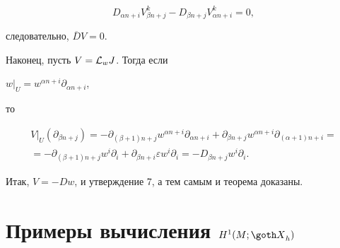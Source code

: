 $$


D_{\alpha n + i}V_{\beta n + j}^k -D_{\beta n + j}V_{\alpha n + i}^k = 0,


$$


следовательно, $\overline D V = 0$.





Наконец, пусть $V = {\cal L}_wJ$. Тогда если


$\left. w \right|_U =


w^{\alpha n + i}\partial_{\alpha n + i}$,


то


\begin{gather*}


\left. V \right|_U(\partial_{\beta n + j}) =


-


\partial_{(\beta+1)n + j}w^{\alpha n + i}\partial_{\alpha n + i}


+ \partial_{\beta n + j}w^{\alpha n + i}\partial_{(\alpha + 1)n + i}


=\\


%


= - \partial_{(\beta+1)n + j} w^i \partial_i  +


\partial_{\beta n + i} \varepsilon w^i \partial_i =


- D_{\beta n + j}w^i \partial_i.


\end{gather*}


Итак, $V = - D w$, и утверждение 7, а тем самым и теорема доказаны.





\section{Примеры вычисления $H^1(M;{\goth X}_h)$}





